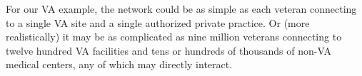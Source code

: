 For our VA example, the network could be as simple as each veteran connecting to a single VA site and a single authorized private practice.
Or (more realistically) it may be as complicated as nine million veterans connecting to twelve hundred VA facilities and tens or hundreds of thousands of non-VA medical centers, any of which may directly interact.
